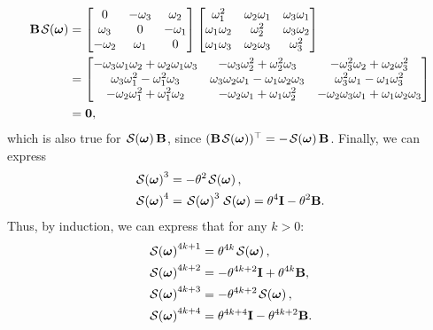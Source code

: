 \begin{align}
    \mathbf{B}\SL[\boldsymbol{\omega}] &= \begin{bmatrix}
        0 & -\omega_3 & \omega_2\\
        \omega_3 & 0 & -\omega_1 \\
        -\omega_2 & \omega_1 & 0
    \end{bmatrix}\begin{bmatrix}
        \omega_1^2 & \omega_2\omega_1 & \omega_3\omega_1\\
        \omega_1\omega_2 & \omega_2^2 & \omega_3\omega_2 \\
        \omega_1\omega_3 & \omega_2\omega_3 & \omega_3^2
    \end{bmatrix}\\
    &= \begin{bmatrix}
        -\omega_3\omega_1\omega_2 + \omega_2\omega_1\omega_3 & -\omega_3\omega_2^2+\omega_2^2\omega_3 & -\omega_3^2\omega_2 + \omega_2\omega_3^2\\
        \omega_3\omega_1^2-\omega_1^2\omega_3 & \omega_3\omega_2\omega_1 - \omega_1\omega_2\omega_3 & \omega_3^2\omega_1 - \omega_1\omega_3^2\\
        -\omega_2\omega_1^2 + \omega_1^2\omega_2 & -\omega_2\omega_1 + \omega_1\omega_2^2 & -\omega_2\omega_3\omega_1 + \omega_1\omega_2\omega_3
    \end{bmatrix}\\
    &=\mathbf{0},
\end{align}
which is also true for $\SL[\boldsymbol{\omega}]\mathbf{B}$, since $(\mathbf{B}\SL[\boldsymbol{\omega}])^\top=-\SL[\boldsymbol{\omega}]\mathbf{B}$. Finally, we can express
\begin{align}
    \SL[\boldsymbol{\omega}]^3 &= -\theta^2\SL[\boldsymbol{\omega}],\\
    \SL[\boldsymbol{\omega}]^4 &= \SL[\boldsymbol{\omega}]^3\SL[\boldsymbol{\omega}] = \theta^4\mathbf{I} - \theta^2\mathbf{B}.
\end{align}
Thus, by induction, we can express that for any $k>0$:
\begin{align}
    \SL[\boldsymbol{\omega}]^{4k+1} &= \theta^{4k}\SL[\boldsymbol{\omega}],\\
    \SL[\boldsymbol{\omega}]^{4k+2} &= -\theta^{4k+2}\mathbf{I} + \theta^{4k}\mathbf{B},\\
    \SL[\boldsymbol{\omega}]^{4k+3} &= -\theta^{4k+2}\SL[\boldsymbol{\omega}],\\
    \SL[\boldsymbol{\omega}]^{4k+4} &= \theta^{4k+4}\mathbf{I} - \theta^{4k+2}\mathbf{B}.
\end{align}

